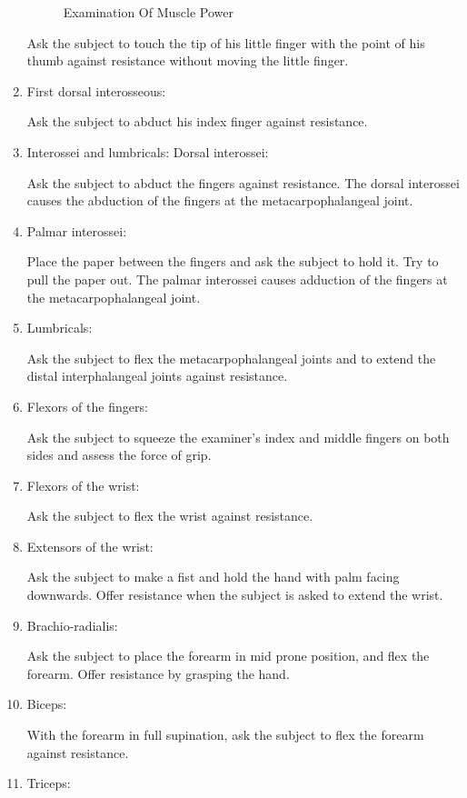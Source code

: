 \documentclass[a4paper,12pt]{book}
\begin{document}
\begin{enumerate}
{{\begin{figure}[H]
\begin{subfigure}[t]{\textwidth}
		\end{subfigure}
		\hspace{\fill}
			\caption*{Examination Of Muscle Power}
		\end{figure}
		}
	\par
	Ask the subject to touch the tip of his little finger with the point of his thumb against resistance without moving the little finger.
}
\item{ First dorsal interosseous:
	\par
	Ask the subject to abduct his index finger against resistance.
}
\item{ Interossei and lumbricals: Dorsal interossei:
	\par
	Ask the subject to abduct the fingers against resistance. The dorsal interossei causes the abduction of the fingers at the metacarpophalangeal joint.
}
\item{	Palmar interossei:
	\par
	Place the paper between the fingers and ask the subject to hold it. Try to pull the paper out. The palmar interossei causes adduction of the fingers at the metacarpophalangeal joint.
			}
\item{Lumbricals:
	\par
	Ask the subject to flex the metacarpophalangeal joints and to extend the distal interphalangeal joints against resistance.
}
\item{ Flexors of the fingers: 
\par
Ask the subject to squeeze the examiner's index and middle fingers on both sides and assess the force of grip.
}
\item{ Flexors of the wrist: 
\par
Ask the subject to flex the wrist against resistance.
}
\item{ Extensors of the wrist: 
\par
Ask the subject to make a fist and hold the hand with palm facing downwards. Offer resistance when the subject is asked to extend the wrist.
}
\item{ Brachio-radialis: 
\par
Ask the subject to place the forearm in mid prone position, and flex the forearm. Offer resistance by grasping the hand.
}
\item{ Biceps: 
\par
With the forearm in full supination, ask the subject to flex the forearm against resistance.
}
\item{ Triceps: 
\par
}
\end{enumerate}
\end{document}
